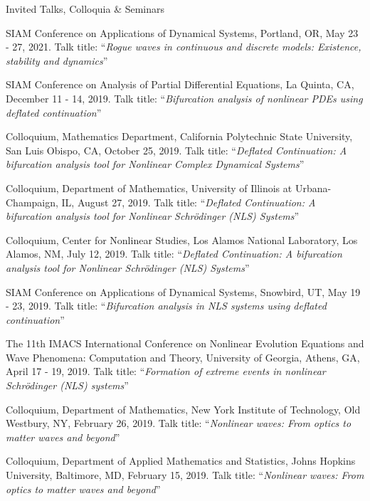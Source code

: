 \documentclass[10pt]{article} %
\begin{document}
\begin{section}{Invited Talks, Colloquia \& Seminars}
\begin{etaremune}
\item SIAM Conference on Applications of Dynamical Systems, Portland, OR, May 23 - 27, 2021. Talk title:
``\textit{Rogue waves in continuous and discrete models: Existence, stability and dynamics}''

\item SIAM Conference on Analysis of Partial Differential Equations, La Quinta, CA, December 11 - 14, 2019.
Talk title: ``\textit{Bifurcation analysis of nonlinear PDEs using deflated continuation}''

\item Colloquium, Mathematics Department, California Polytechnic State University, San Luis Obispo, CA, October 25, 2019.
Talk title: ``\textit{Deflated Continuation: A bifurcation analysis tool for Nonlinear Complex Dynamical Systems}''

\item Colloquium, Department of Mathematics, University of Illinois at Urbana-Champaign, IL, August 27, 2019.
      Talk title: ``\textit{Deflated Continuation: A bifurcation analysis tool for Nonlinear Schr\"odinger (NLS) Systems}''

\item Colloquium, Center for Nonlinear Studies, Los Alamos National Laboratory, Los Alamos, NM, July 12, 2019.
      Talk title: ``\textit{Deflated Continuation: A bifurcation analysis tool for Nonlinear Schr\"odinger (NLS) Systems}''

\item SIAM Conference on Applications of Dynamical Systems, Snowbird, UT, May 19 - 23, 2019. Talk title:
                    ``\textit{Bifurcation analysis in NLS systems using deflated continuation}''

\item The 11th IMACS International Conference on Nonlinear Evolution Equations and Wave Phenomena: Computation and Theory, %
        University of Georgia, Athens, GA, April 17 - 19, 2019.
        Talk title: ``\textit{Formation of extreme events in nonlinear Schr\"odinger (NLS) systems}''

\item  Colloquium, Department of Mathematics, New York Institute of Technology, Old Westbury, NY, February 26, 2019.
       Talk title: ``\textit{Nonlinear waves: From optics to matter waves and beyond}''

\item   Colloquium, Department of Applied Mathematics and Statistics, Johns Hopkins University, Baltimore, MD, February 15, 2019.
       Talk title: ``\textit{Nonlinear waves: From optics to matter waves and beyond}''


\end{etaremune}
\end{section}
\end{document}
